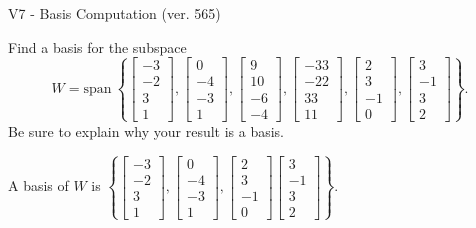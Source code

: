 \begin{exercise}
  \begin{exerciseTitle}V7 - Basis Computation (ver. 565)\end{exerciseTitle}
  \begin{exerciseStatement}
    Find a basis for the subspace 
\[W=\mathrm{span}\ \left\{\left[\begin{array}{r}
-3 \\
-2 \\
3 \\
1
\end{array}\right] , \left[\begin{array}{r}
0 \\
-4 \\
-3 \\
1
\end{array}\right] , \left[\begin{array}{r}
9 \\
10 \\
-6 \\
-4
\end{array}\right] , \left[\begin{array}{r}
-33 \\
-22 \\
33 \\
11
\end{array}\right] , \left[\begin{array}{r}
2 \\
3 \\
-1 \\
0
\end{array}\right] , \left[\begin{array}{r}
3 \\
-1 \\
3 \\
2
\end{array}\right]\right\}.\]
 Be sure to explain why your result is a basis.


  \end{exerciseStatement}
  \begin{exerciseAnswer}
   A basis of \(W\) is  \(\left\{\left[\begin{array}{r}
-3 \\
-2 \\
3 \\
1
\end{array}\right] , \left[\begin{array}{r}
0 \\
-4 \\
-3 \\
1
\end{array}\right] , \left[\begin{array}{r}
2 \\
3 \\
-1 \\
0
\end{array}\right] \left[\begin{array}{r}
3 \\
-1 \\
3 \\
2
\end{array}\right]\right\}\).
  


  \end{exerciseAnswer}
\end{exercise}